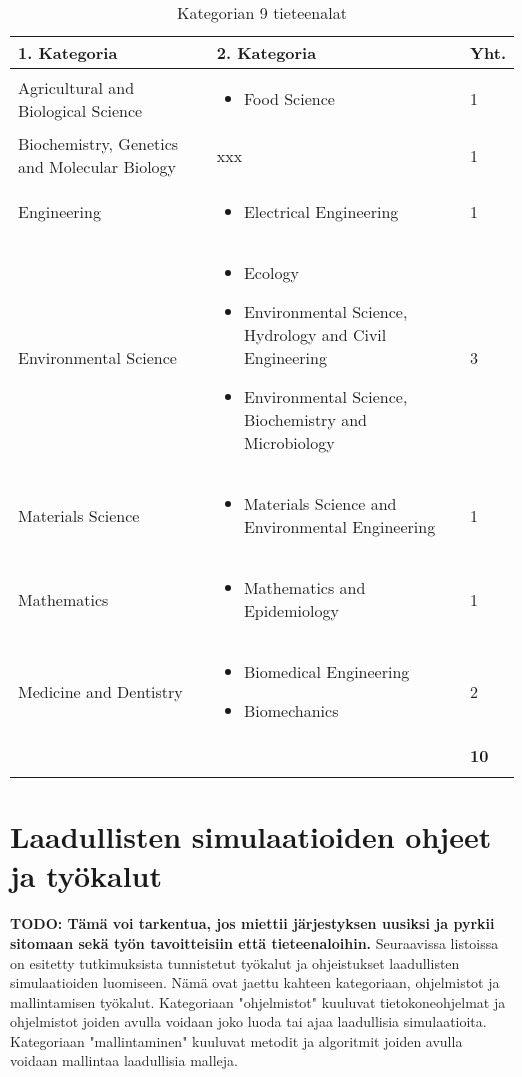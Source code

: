 \documentclass[utf8]{gradu3}
\begin{document}
\begin{longtable}[h]{|p{5cm}|p{8cm}|p{1cm}|}
    \hline
    \textbf{1. Kategoria}    & \textbf{2. Kategoria} & \textbf{Yht.} \\
    \hline
    Agricultural and Biological Science  & \begin{itemize}
        \item Food Science
    \end{itemize} & 1 \\
    \hline
    Biochemistry, Genetics and Molecular Biology & xxx & 1 \\
    \hline
    Engineering & \begin{itemize}
        \item Electrical Engineering
    \end{itemize} & 1 \\
    \hline
    Environmental Science & \begin{itemize}
        \item Ecology
        \item Environmental Science, Hydrology and Civil Engineering
        \item Environmental Science, Biochemistry and Microbiology
    \end{itemize} & 3 \\
    \hline
    Materials Science & \begin{itemize}
        \item Materials Science and Environmental Engineering
    \end{itemize} & 1 \\
    \hline
    Mathematics & \begin{itemize}
        \item Mathematics and Epidemiology
    \end{itemize} & 1 \\
    \hline
    Medicine and Dentistry & \begin{itemize}
        \item Biomedical Engineering
        \item Biomechanics
    \end{itemize} & 2 \\
    \hline
       &   & \textbf{10} \\
    \hline
    \caption{Kategorian 9 tieteenalat}
    \label{table:Kategorian 9 tieteenalat}
\end{longtable}

\section{Laadullisten simulaatioiden ohjeet ja työkalut} \label{tyokalut}
\textbf{TODO: Tämä voi tarkentua, jos miettii järjestyksen uusiksi ja pyrkii sitomaan sekä työn tavoitteisiin että tieteenaloihin.}
Seuraavissa listoissa on esitetty tutkimuksista tunnistetut työkalut ja ohjeistukset laadullisten simulaatioiden luomiseen. Nämä ovat jaettu kahteen kategoriaan, ohjelmistot ja mallintamisen työkalut. Kategoriaan "ohjelmistot" kuuluvat tietokoneohjelmat ja ohjelmistot joiden avulla voidaan joko luoda tai ajaa laadullisia simulaatioita.
Kategoriaan "mallintaminen" kuuluvat metodit ja algoritmit joiden avulla voidaan mallintaa laadullisia malleja.
\end{document}
